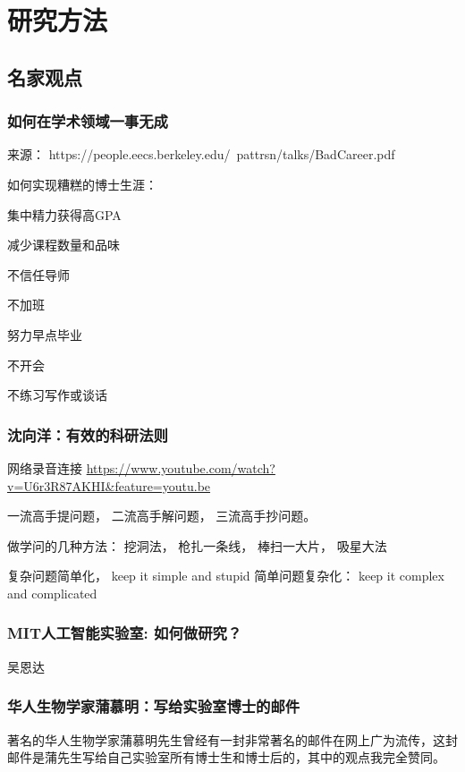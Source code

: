 \chapter{研究方法 }


\section{名家观点}


\subsection{如何在学术领域一事无成}

来源： https://people.eecs.berkeley.edu/~pattrsn/talks/BadCareer.pdf


如何实现糟糕的博士生涯：

集中精力获得高GPA

减少课程数量和品味

不信任导师

不加班

努力早点毕业

不开会

不练习写作或谈话






\subsection{沈向洋：有效的科研法则}
网络录音连接
\url{https://www.youtube.com/watch?v=U6r3R87AKHI&feature=youtu.be }

  一流高手提问题， 二流高手解问题， 三流高手抄问题。
  
 做学问的几种方法：  挖洞法， 枪扎一条线， 棒扫一大片， 吸星大法
 
  复杂问题简单化， keep it simple and stupid
  简单问题复杂化： keep it complex and complicated
  
  
\subsection{MIT人工智能实验室: 如何做研究？}

吴恩达


\subsection{华人生物学家蒲慕明：写给实验室博士的邮件}
著名的华人生物学家蒲慕明先生曾经有一封非常著名的邮件在网上广为流传，这封邮件是蒲先生写给自己实验室所有博士生和博士后的，其中的观点我完全赞同。

